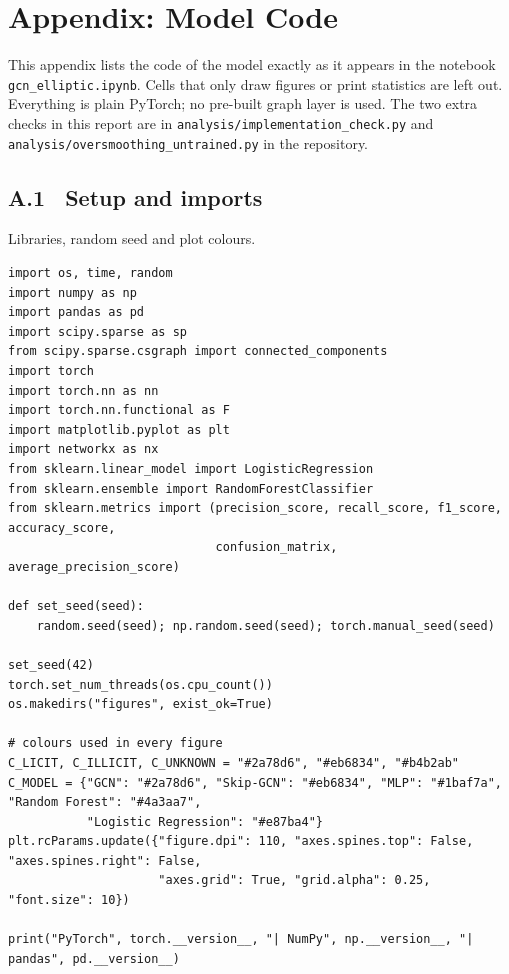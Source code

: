 \section{Appendix: Model Code}\label{sec:code}
\begin{sloppypar}
This appendix lists the code of the model exactly as it appears in the notebook
\texttt{gcn\_elliptic.ipynb}. Cells that only draw figures or print statistics are left out. Everything is plain PyTorch;
no pre-built graph layer is used. The two extra checks in this report are in \texttt{analysis/implementation\_check.py}
and \texttt{analysis/oversmoothing\_untrained.py} in the repository.
\end{sloppypar}

\subsection*{A.1 \ Setup and imports}
Libraries, random seed and plot colours.
\begin{lstlisting}
import os, time, random
import numpy as np
import pandas as pd
import scipy.sparse as sp
from scipy.sparse.csgraph import connected_components
import torch
import torch.nn as nn
import torch.nn.functional as F
import matplotlib.pyplot as plt
import networkx as nx
from sklearn.linear_model import LogisticRegression
from sklearn.ensemble import RandomForestClassifier
from sklearn.metrics import (precision_score, recall_score, f1_score, accuracy_score,
                             confusion_matrix, average_precision_score)

def set_seed(seed):
    random.seed(seed); np.random.seed(seed); torch.manual_seed(seed)

set_seed(42)
torch.set_num_threads(os.cpu_count())
os.makedirs("figures", exist_ok=True)

# colours used in every figure
C_LICIT, C_ILLICIT, C_UNKNOWN = "#2a78d6", "#eb6834", "#b4b2ab"
C_MODEL = {"GCN": "#2a78d6", "Skip-GCN": "#eb6834", "MLP": "#1baf7a", "Random Forest": "#4a3aa7",
           "Logistic Regression": "#e87ba4"}
plt.rcParams.update({"figure.dpi": 110, "axes.spines.top": False, "axes.spines.right": False,
                     "axes.grid": True, "grid.alpha": 0.25, "font.size": 10})

print("PyTorch", torch.__version__, "| NumPy", np.__version__, "| pandas", pd.__version__)
\end{lstlisting}

